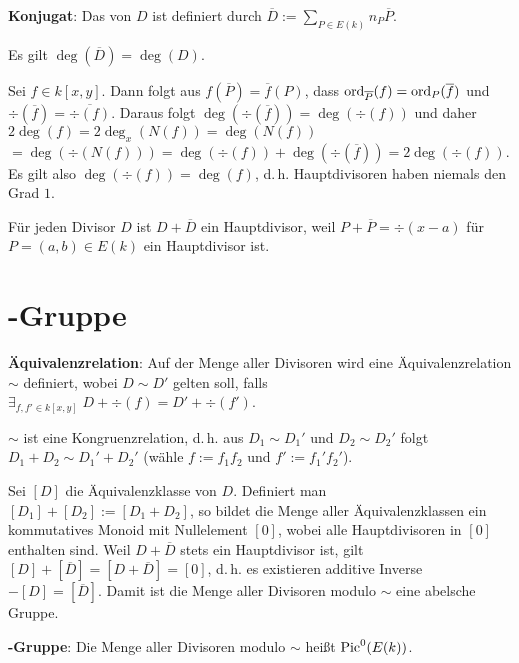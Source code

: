 \linie

\textbf{Konjugat}:
Das  von $D$ ist definiert durch
$\overline{D} := \sum_{P \in E(k)} n_P \overline{P}$.

Es gilt $\deg(\overline{D}) = \deg(D)$.

Sei $f \in k[x, y]$.
Dann folgt aus $f(\overline{P}) = \overline{f}(P)$, dass
$\operatorname{ord}_{\overline{P}}(f) = \operatorname{ord}_P(\overline{f})$ und
$\div(\overline{f}) = \overline{\div(f)}$.
Daraus folgt $\deg(\div(\overline{f})) = \deg(\div(f))$ und daher
$2\deg(f) = 2\deg_x(N(f)) = \deg(N(f))$\\
$= \deg(\div(N(f))) = \deg(\div(f)) + \deg(\div(\overline{f})) = 2\deg(\div(f))$.\\
Es gilt also $\deg(\div(f)) = \deg(f)$, d.\,h. Hauptdivisoren haben niemals den Grad $1$.

Für jeden Divisor $D$ ist $D + \overline{D}$ ein Hauptdivisor,
weil $P + \overline{P} = \div(x - a)$ für $P = (a, b) \in E(k)$ ein Hauptdivisor ist.

\pagebreak

\section{%
    -Gruppe%
}

\textbf{Äquivalenzrelation}:
Auf der Menge aller Divisoren wird eine Äquivalenzrelation $\sim$ definiert,
wobei $D \sim D'$ gelten soll, falls $\exists_{f, f' \in k[x, y]}\; D + \div(f) = D' + \div(f')$.

$\sim$ ist eine Kongruenzrelation, d.\,h. aus
$D_1 \sim D_1'$ und $D_2 \sim D_2'$ folgt $D_1 + D_2 \sim D_1' + D_2'$
(wähle $f := f_1 f_2$ und $f' := f_1' f_2'$).

Sei $[D]$ die Äquivalenzklasse von $D$.
Definiert man $[D_1] + [D_2] := [D_1 + D_2]$, so bildet die Menge aller Äquivalenzklassen
ein kommutatives Monoid mit Nullelement $[0]$,
wobei alle Hauptdivisoren in $[0]$ enthalten sind.
Weil $D + \overline{D}$ stets ein Hauptdivisor ist, gilt
$[D] + [\overline{D}] = [D + \overline{D}] = [0]$, d.\,h. es existieren additive Inverse
$-[D] = [\overline{D}]$.
Damit ist die Menge aller Divisoren modulo $\sim$ eine abelsche Gruppe.

\textbf{-Gruppe}:
Die Menge aller Divisoren modulo $\sim$ heißt  $\operatorname{Pic}^0(E(k))$.

\linie

